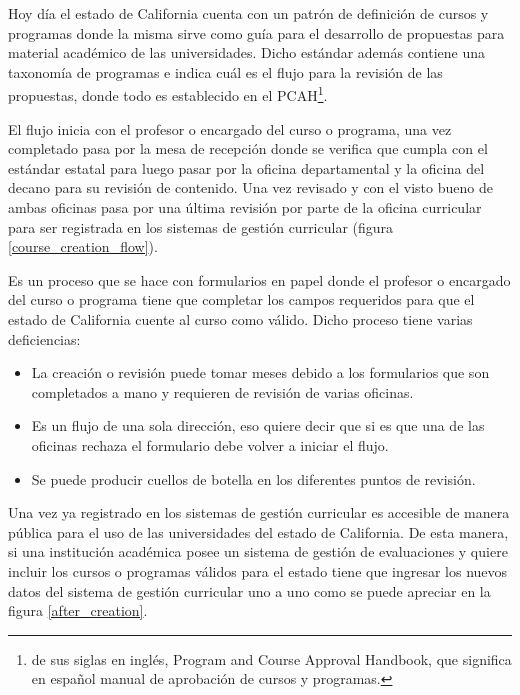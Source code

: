 Hoy día el estado de California cuenta con un patrón de definición de cursos y programas donde la misma sirve como guía para el desarrollo de propuestas para material académico de las universidades. Dicho estándar además contiene una taxonomía de programas e indica cuál es el flujo para la revisión de las propuestas, donde todo es establecido en el PCAH\footnote{de sus siglas en inglés, Program and Course Approval Handbook, que significa en español manual de aprobación de cursos y programas.}\citep{brice_w_harris_program_2013}.

El flujo inicia con el profesor o encargado del curso o programa, una vez completado pasa por la mesa de recepción donde se verifica que cumpla con el estándar estatal para luego pasar por la oficina departamental y la oficina del decano para su revisión de contenido. Una vez revisado y con el visto bueno de ambas oficinas pasa por una última revisión por parte de la oficina curricular para ser registrada en los sistemas de gestión curricular (figura \ref{course_creation_flow}).

Es un proceso que se hace con formularios en papel donde el profesor o encargado del curso o programa tiene que completar los campos requeridos para que el estado de California cuente al curso como válido. Dicho proceso tiene varias deficiencias:
\begin{itemize}
	\item La creación o revisión puede tomar meses debido a los formularios que son completados a mano y requieren de revisión de varias oficinas.
	\item Es un flujo de una sola dirección, eso quiere decir que si es que una de las oficinas rechaza el formulario debe volver a iniciar el flujo.
	\item Se puede producir cuellos de botella en los diferentes puntos de revisión.
\end{itemize}

Una vez ya registrado en los sistemas de gestión curricular es accesible de manera pública para el uso de las universidades del estado de California. De esta manera, si una institución académica posee un sistema de gestión de evaluaciones y quiere incluir los cursos o programas válidos para el estado tiene que ingresar los nuevos datos del sistema de gestión curricular uno a uno como se puede apreciar en la figura \ref{after_creation}.

